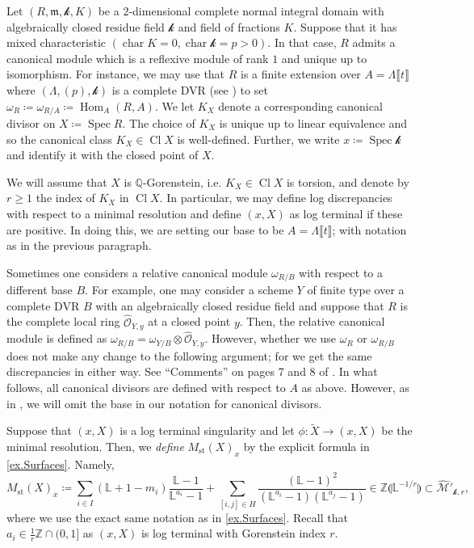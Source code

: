 \documentclass[12pt]{amsart}
\theoremstyle{plain}   %
\theoremstyle{definition}    %
\theoremstyle{remark}    %
\numberwithin{equation}{theorem}
\DeclareMathOperator{\Cl}{{Cl}}
\DeclareMathOperator{\st}{\mathrm{st}}
\DeclareMathOperator{\Spec}{{Spec}}
\DeclareMathOperator{\Char}{{char}}
\DeclareMathOperator{\Hom}{Hom}
\newcommand{\kay}{\mathcal{k}}
\newcommand{\sM}{\mathcal{M}}
\newcommand{\sO}{\mathcal{O}}
\newcommand{\fram}{\mathfrak{m}}
\newcommand{\bL}{\mathbb{L}}
\newcommand{\bQ}{\mathbb{Q}}
\newcommand{\bZ}{\mathbb{Z}}
\begin{document}
Let $(R,\fram,\kay,K)$ be a $2$-dimensional complete normal integral domain with algebraically closed residue field $\kay$ and field of fractions $K$. Suppose that it has mixed characteristic $(\Char K =0,\Char\kay = p>0)$. In that case, $R$ admits a canonical module which is a reflexive module of rank $1$ and unique up to isomorphism. For instance, we may use that $R$ is a finite extension over $A= \Lambda\llbracket t \rrbracket $ where $(\Lambda, (p), \kay)$ is a complete DVR (see \cite[\href{https://stacks.math.columbia.edu/tag/032D}{Tag 032D}]{stacks-project}) to set $\omega_R \coloneqq \omega_{R/A} \coloneqq \Hom_A(R,A)$. We let $K_X$ denote a corresponding canonical divisor on $X \coloneqq \Spec R$. The choice of $K_X$ is unique up to linear equivalence and so the canonical class $K_X\in \Cl X$ is well-defined. Further, we write $x \coloneqq \Spec \kay$ and identify it with the closed point of $X$. 

We will assume that $X$ is $\bQ$-Gorenstein, i.e. $K_X \in \Cl X$ is torsion, and denote by $r \geq 1$ the index of $K_X$ in $\Cl X$. In particular, we may define log discrepancies with respect to a minimal resolution and define $(x,X)$ as log terminal if these are positive. In doing this, we are setting our base to be $A=\Lambda\llbracket t \rrbracket$; with notation as in the previous paragraph. 

\begin{remark}
Sometimes one considers a relative canonical module $\omega_{R/B}$ with respect to a different base $B$. For example, one may consider a scheme $Y$ of finite type over a complete DVR $B$ with an algebraically closed residue field and suppose that $R$ is the complete local ring $\hat{\sO}_{Y,y}$ at a closed point $y$. Then, the relative canonical module is defined as $\omega_{R/B}=\omega_{Y/B}\otimes \hat{\sO}_{Y,y}$. However, whether we use  $\omega_R$ or $\omega_{R/B}$ does not make any change to the following argument; for we get the same discrepancies in either way. See ``Comments'' on pages 7 and 8 of  \cite{KollarSingulaitieofMMP}. In what follows, all canonical divisors are defined with respect to $A$ as above. However, as in \cite{KollarSingulaitieofMMP}, we will omit the base in our notation for canonical divisors.
\end{remark}

Suppose that $(x,X)$ is a log terminal singularity and let $\phi \colon\tilde{X} \to (x,X)$ be the minimal resolution. Then, we \emph{define} $M_{\st}(X)_x$ by the explicit formula in \autoref{ex.Surfaces}. Namely,
\[
M_{\st}(X)_x \coloneqq \sum_{i\in I} (\bL +1 - m_i) \frac{\bL-1}{\bL^{a_{i}}-1}+\sum_{[i,j]\in H}\frac{(\bL-1)^{2}}{(\bL^{a_i}-1)(\bL^{a_j}-1)} \in \bZ\llparenthesis\bL^{-1/r} \rrparenthesis \subset \hat{\sM}'_{\kay,r},
\]
where we use the exact same notation as in \autoref{ex.Surfaces}. Recall that $a_i \in\frac{1}{r}\bZ \cap (0,1]$ as $(x,X)$ is log terminal with Gorenstein index $r$. 
 
\end{document}
